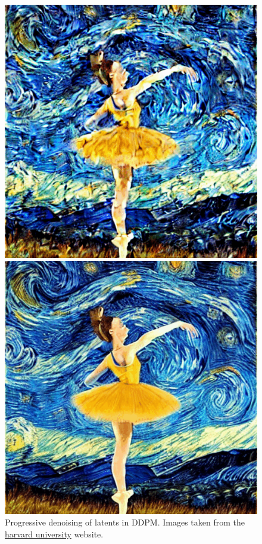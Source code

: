 \begin{figure}[h]
\begin{minipage}{0.10\textwidth}
    \end{minipage}
    \begin{minipage}{0.10\textwidth}
        \centering
        \includegraphics[width=\textwidth]{images/diffusion_models/noise_to_image_gif/6.png}
    \end{minipage}
    \begin{minipage}{0.10\textwidth}
        \centering
        \includegraphics[width=\textwidth]{images/diffusion_models/noise_to_image_gif/7.png}
    \end{minipage}
    \caption{Progressive denoising of latents in DDPM. Images taken from the \href{https://scholar.harvard.edu/binxuw/classes/machine-learning-scratch/materials/stable-diffusion-scratch}{harvard university} website.}
\end{figure}
